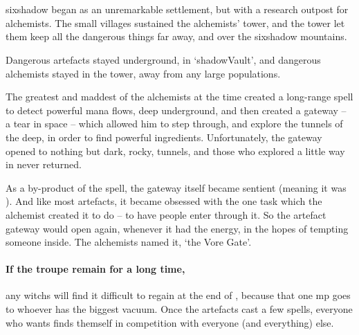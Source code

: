 
\section[\Glsfmttext{shadowVault}]{}
\label{shadowVault}

\begin{multicols}{2}


\begin{exampletext}
  \noindent
  \Gls{sixshadow} began as an unremarkable settlement, but with a research outpost for alchemists.
  The small \glspl{village} sustained the alchemists' tower, and the tower let them keep all the dangerous things far away, and over the \gls{sixshadow} mountains.

  Dangerous \glspl{artefact} stayed underground, in `\gls{shadowVault}', and dangerous alchemists stayed in the tower, away from any large populations.

  The greatest and maddest of the alchemists at the time created a long-range spell to detect powerful mana flows, deep underground, and then created a gateway -- a tear in space -- which allowed him to step through, and explore the tunnels of the \gls{deep}, in order to find powerful \glspl{ingredient}.
  Unfortunately, the gateway opened to nothing but dark, rocky, tunnels, and those who explored a little way in never returned.

  As a by-product of the spell, the gateway itself became sentient (meaning it was ).
  And like most \glspl{artefact}, it became obsessed with the one task which the alchemist created it to do -- to have people enter through it.
  So the \gls{artefact} gateway would open again, whenever it had the energy, in the hopes of tempting someone inside.
  The alchemists named it, `the Vore Gate'.
\end{exampletext}

\paragraph{If the troupe remain for a long time,}
any \glspl{witch} will find it difficult to regain  at the end of , because that one \gls{mp} goes to whoever has the biggest vacuum.
Once the \glspl{artefact} cast a few spells, everyone who wants  finds themself in competition with everyone (and everything) else.


\end{multicols}
